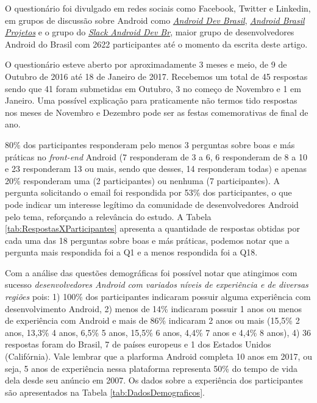 O question\'ario foi divulgado em redes sociais como Facebook, Twitter e Linkedin, em grupos de discuss\~ao sobre Android como \href{https://groups.google.com/forum/#!forum/androidbrasil-dev}{\textit{Android Dev Brasil}}, \href{https://groups.google.com/forum/\#!forum/android-brasil--projetos}{\textit{Android Brasil Projetos}} e o grupo do \href{http://slack.androiddevbr.org/}{\textit{Slack Android Dev Br}}, maior grupo de desenvolvedores Android do Brasil com 2622 participantes at\'e o momento da escrita deste artigo. 

O question\'ario esteve aberto por aproximadamente 3 meses e meio, de 9 de Outubro de 2016 at\'e 18 de Janeiro de 2017. Recebemos um total de 45 respostas sendo que 41 foram submetidas em Outubro, 3 no come\c{c}o de Novembro e 1 em Janeiro. Uma poss\'ivel explica\c{c}\~ao para praticamente n\~ao termos tido respostas nos meses de Novembro e Dezembro pode ser as festas comemorativas de final de ano. 

80\% dos participantes responderam pelo menos 3 perguntas sobre boas e m\'as pr\'aticas no \textit{front-end} Android (7 responderam de 3 a 6, 6 responderam de 8 a 10 e 23 responderam 13 ou mais, sendo que desses, 14 responderam todas) e apenas 20\% responderam uma (2 participantes) ou nenhuma (7 participantes). A pergunta solicitando o email foi respondida por 53\% dos participantes, o que pode indicar um interesse leg\'itimo da comunidade de desenvolvedores Android pelo tema, refor\c{c}ando a relev\^ancia do estudo. A Tabela \ref{tab:RespostasXParticipantes} apresenta a quantidade de respostas obtidas por cada uma das 18 perguntas sobre boas e m\'as pr\'aticas, podemos notar que a pergunta mais respondida foi a Q1 e a menos respondida foi a Q18.

Com a an\'alise das quest\~oes demogr\'aficas foi poss\'ivel notar que atingimos com sucesso \textit{desenvolvedores Android com variados n\'iveis de experi\^encia e de diversas regi\~oes} pois: 1) 100\% dos participantes indicaram possuir alguma experi\^encia com desenvolvimento Android, 2) menos de 14\% indicaram possuir 1 anos ou menos de experi\^encia com Android e mais de 86\% indicaram 2 anos ou mais (15,5\% 2 anos, 13,3\% 4 anos, 6,5\% 5 anos, 15,5\% 6 anos, 4,4\% 7 anos e 4,4\% 8 anos), 4) 36 respostas foram do Brasil, 7 de pa\'ises europeus e 1 dos Estados Unidos (Calif\'ornia). Vale lembrar que a plarforma Android completa 10 anos em 2017, ou seja, 5 anos de experi\^encia nessa plataforma representa 50\% do tempo de vida dela desde seu an\'uncio em 2007. Os dados sobre a experi\^encia dos participantes s\~ao apresentados na Tabela \ref{tab:DadosDemograficos}.

